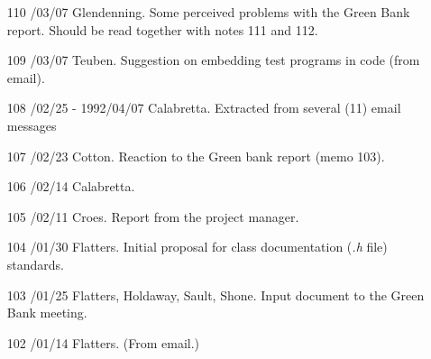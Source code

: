\begin{enumerate}
\item[110]
/03/07 Glendenning.
\linebreak  Some perceived problems with the Green Bank report.  Should be read
   together with notes 111 and 112.

\item[109]
/03/07 Teuben.
\linebreak  Suggestion on embedding test programs in code (from email).

\item[108]
/02/25 - 1992/04/07 Calabretta.
\linebreak  Extracted from several (11) email messages

\item[107]
/02/23 Cotton.
\linebreak  Reaction to the Green bank report (memo 103).

\item[106]
/02/14 Calabretta.

\item[105]
/02/11 Croes.
\linebreak  Report from the project manager.

\item[104]
/01/30 Flatters.
\linebreak  Initial proposal for class documentation (\textsl{.h} file) standards.

\item[103]
/01/25 Flatters, Holdaway, Sault, Shone.
\linebreak  Input document to the Green Bank meeting.

\item[102]
/01/14 Flatters.
\linebreak  (From email.)

\end{enumerate}
